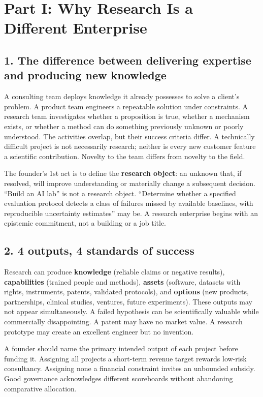 \section{Part I: Why Research Is a Different Enterprise}

\subsection{1. The difference between delivering expertise and producing new knowledge}

A consulting team deploys knowledge it already possesses to solve a client's problem. A product team engineers a repeatable solution under constraints. A research team investigates whether a proposition is true, whether a mechanism exists, or whether a method can do something previously unknown or poorly understood. The activities overlap, but their success criteria differ. A technically difficult project is not necessarily research; neither is every new customer feature a scientific contribution. Novelty to the team differs from novelty to the field.

The founder's 1st act is to define the \textbf{research object}: an unknown that, if resolved, will improve understanding or materially change a subsequent decision. ``Build an AI lab'' is not a research object. ``Determine whether a specified evaluation protocol detects a class of failures missed by available baselines, with reproducible uncertainty estimates'' may be. A research enterprise begins with an epistemic commitment, not a building or a job title.

\subsection{2. 4 outputs, 4 standards of success}

Research can produce \textbf{knowledge} (reliable claims or negative results), \textbf{capabilities} (trained people and methods), \textbf{assets} (software, datasets with rights, instruments, patents, validated protocols), and \textbf{options} (new products, partnerships, clinical studies, ventures, future experiments). These outputs may not appear simultaneously. A failed hypothesis can be scientifically valuable while commercially disappointing. A patent may have no market value. A research prototype may create an excellent engineer but no invention.

A founder should name the primary intended output of each project before funding it. Assigning all projects a short-term revenue target rewards low-risk consultancy. Assigning none a financial constraint invites an unbounded subsidy. Good governance acknowledges different scoreboards without abandoning comparative allocation.

